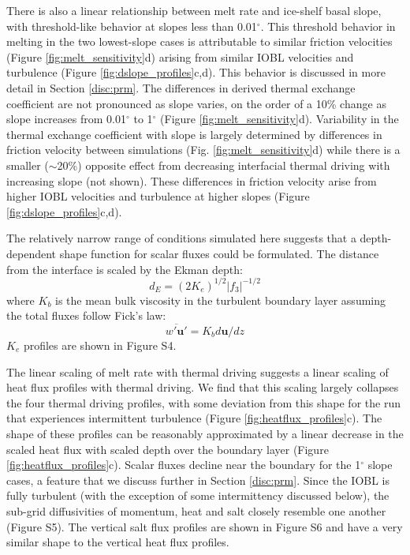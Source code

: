 \documentclass[draft]{agujournal2019}
\begin{document}
There is also a linear relationship between melt rate and ice-shelf basal slope, with threshold-like behavior at slopes less than 0.01$^{\circ}$. This threshold behavior in melting in the two lowest-slope cases is attributable to similar friction velocities (Figure \ref{fig:melt_sensitivity}d) arising from similar IOBL velocities and turbulence  (Figure \ref{fig:dslope_profiles}c,d). This behavior is discussed in more detail in Section \ref{disc:prm}. The differences in derived thermal exchange coefficient are not pronounced as slope varies, on the order of a 10\% change as slope increases from 0.01$^{\circ}$ to 1$^{\circ}$ (Figure \ref{fig:melt_sensitivity}d). Variability in the thermal exchange coefficient with slope is largely determined by differences in friction velocity between simulations (Fig. \ref{fig:melt_sensitivity}d) while there is a smaller ($\sim$20\%) opposite effect from decreasing interfacial thermal driving with increasing slope (not shown). These differences in friction velocity arise from higher IOBL velocities and turbulence at higher slopes (Figure \ref{fig:dslope_profiles}c,d). 

The relatively narrow range of conditions simulated here suggests that a depth-dependent shape function for scalar fluxes could be formulated. The distance from the interface is scaled by the Ekman depth:
\begin{equation}
    d_E = (2 K_e)^{1/2} |f_3|^{-1/2}
\end{equation}
where $K_{b}$ is the mean bulk viscosity in the turbulent boundary layer assuming the total fluxes follow Fick's law:
\begin{equation}
    \overline{w'\mathbf{u}'} = K_{b} d\mathbf{u}/dz
\end{equation}
$K_e$ profiles are shown in Figure S4. 

The linear scaling of melt rate with thermal driving suggests a linear scaling of heat flux profiles with thermal driving. We find that this scaling largely collapses the four thermal driving profiles, with some deviation from this shape for the run that experiences intermittent turbulence (Figure \ref{fig:heatflux_profiles}c). The shape of these profiles can be reasonably approximated by a linear decrease in the scaled heat flux with scaled depth over the boundary layer (Figure \ref{fig:heatflux_profiles}c). Scalar fluxes decline near the boundary for the 1$^{\circ}$ slope cases, a feature that we discuss further in Section \ref{disc:prm}. Since the IOBL is fully turbulent (with the exception of some intermittency discussed below), the sub-grid diffusivities of momentum, heat and salt closely resemble one another (Figure S5). The vertical salt flux profiles are shown in Figure S6 and have a very similar shape to the vertical heat flux profiles.
\end{document}
